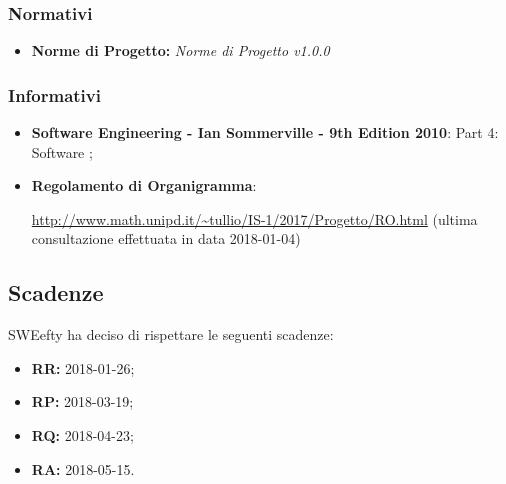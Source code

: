 			\subsubsection{Normativi}
			\begin{itemize}
				\item \textbf{Norme di Progetto:} \emph{Norme di Progetto v1.0.0}
			\end{itemize}
			\subsubsection{Informativi}
			\begin{itemize}
				\item \textbf{Software Engineering - Ian Sommerville - 9th Edition 2010}:  Part 4: Software ;
				\item \textbf{Regolamento di Organigramma}: \par
				\url{http://www.math.unipd.it/~tullio/IS-1/2017/Progetto/RO.html} (ultima consultazione effettuata in data 2018-01-04)
			\end{itemize}
			
	\subsection{Scadenze}
	\label{scadenze}
	SWEefty ha deciso di rispettare le seguenti scadenze:
	\begin{itemize}
		\item \textbf{RR:} 2018-01-26;
		\item \textbf{RP:} 2018-03-19;
		\item \textbf{RQ:} 2018-04-23;
		\item \textbf{RA:} 2018-05-15.
	\end{itemize}
